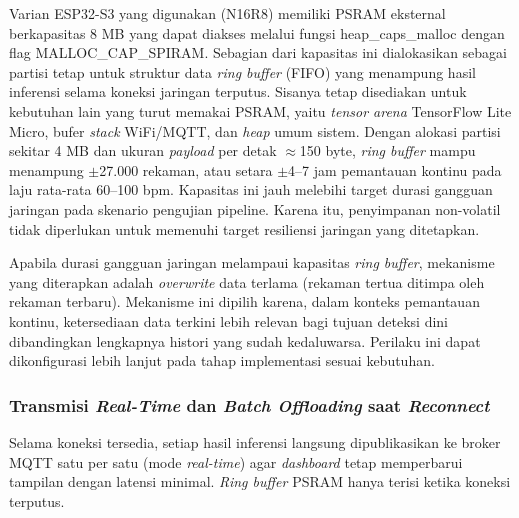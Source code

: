 Varian ESP32-S3 yang digunakan (N16R8) memiliki PSRAM eksternal berkapasitas 8 MB
yang dapat diakses melalui fungsi heap\_caps\_malloc dengan flag MALLOC\_CAP\_SPIRAM.
Sebagian dari kapasitas ini dialokasikan sebagai partisi tetap untuk struktur data
\textit{ring buffer} (FIFO) yang menampung hasil inferensi selama koneksi jaringan
terputus. Sisanya tetap disediakan untuk kebutuhan lain yang turut memakai
PSRAM, yaitu \textit{tensor arena} TensorFlow Lite Micro, bufer \textit{stack} WiFi/MQTT,
dan \textit{heap} umum sistem. Dengan alokasi partisi sekitar 4 MB dan ukuran
\textit{payload} per detak $\approx$150 byte, \textit{ring buffer} mampu menampung
$\pm$27.000 rekaman, atau setara $\pm$4--7 jam pemantauan kontinu pada laju rata-rata
60--100 bpm. Kapasitas ini jauh melebihi target durasi gangguan jaringan pada skenario
pengujian pipeline. Karena itu, penyimpanan
non-volatil tidak diperlukan untuk memenuhi target resiliensi jaringan yang ditetapkan.

Apabila durasi gangguan jaringan melampaui kapasitas \textit{ring buffer}, mekanisme
yang diterapkan adalah \textit{overwrite} data terlama (rekaman tertua ditimpa oleh
rekaman terbaru). Mekanisme ini dipilih karena, dalam konteks pemantauan kontinu,
ketersediaan data terkini lebih relevan bagi tujuan deteksi dini dibandingkan lengkapnya
histori yang sudah kedaluwarsa. Perilaku ini dapat dikonfigurasi lebih lanjut pada tahap
implementasi sesuai kebutuhan.

\subsubsection{Transmisi \textit{Real-Time} dan \textit{Batch Offloading} saat \textit{Reconnect}}

Selama koneksi tersedia, setiap hasil inferensi langsung dipublikasikan ke broker MQTT
satu per satu (mode \textit{real-time}) agar \textit{dashboard} tetap memperbarui
tampilan dengan latensi minimal. \textit{Ring buffer} PSRAM hanya terisi ketika koneksi
terputus.

